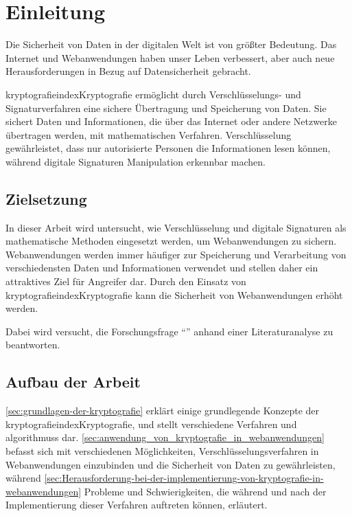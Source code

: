 \section{Einleitung}\label{sec:einleitung}
Die Sicherheit von Daten in der digitalen Welt ist von größter Bedeutung. 
Das Internet und Webanwendungen haben unser Leben verbessert, aber auch neue Herausforderungen in Bezug auf Datensicherheit gebracht.

\Gls{kryptografie}index{Kryptografie} ermöglicht durch Verschlüsselungs- und Signaturverfahren eine sichere Übertragung und Speicherung von Daten.
Sie sichert Daten und Informationen, die über das Internet oder andere Netzwerke übertragen werden, mit mathematischen Verfahren. 
Verschlüsselung gewährleistet, dass nur autorisierte Personen die Informationen lesen können, während digitale Signaturen Manipulation erkennbar machen.


\subsection{Zielsetzung}\label{subsec:zielsetzung}
In dieser Arbeit wird untersucht, wie Verschlüsselung und digitale Signaturen als mathematische Methoden eingesetzt werden, um Webanwendungen zu sichern.
Webanwendungen werden immer häufiger zur Speicherung und Verarbeitung von verschiedensten Daten und Informationen verwendet und stellen daher ein attraktives Ziel für Angreifer dar.
Durch den Einsatz von \gls{kryptografie}index{Kryptografie} kann die Sicherheit von Webanwendungen erhöht werden.

Dabei wird versucht, die Forschungsfrage \enquote{\myForschungsfrage} anhand einer Literaturanalyse zu beantworten.


\subsection{Aufbau der Arbeit}\label{subsec:aufbau-der-arbeit}
 \autoref{sec:grundlagen-der-kryptografie} erklärt einige grundlegende Konzepte der \gls{kryptografie}index{Kryptografie}, und stellt verschiedene  Verfahren und \glspl{algorithmus} dar.
\autoref{sec:anwendung_von_kryptografie_in_webanwendungen} befasst sich mit verschiedenen Möglichkeiten, Verschlüsselungsverfahren in Webanwendungen einzubinden und die Sicherheit von Daten zu gewährleisten, während  \autoref{sec:Herausforderung-bei-der-implementierung-von-kryptografie-in-webanwendungen} Probleme und Schwierigkeiten, die während und nach der Implementierung dieser Verfahren auftreten können, erläutert.